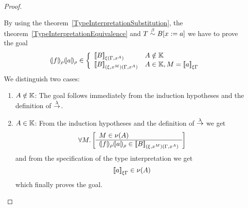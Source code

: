 \begin{theorem}
\begin{proof}
\begin{enumerate}
            By using the theorem~\ref{TypeInterpretationSubstitution}, the
            theorem~\ref{TypeInterpretationEquivalence} and $T
            \stackrel{\beta}{\sim} B[x:=a]$ we have to prove the goal
            $$
            \terminter{f}{\rho}
            \terminter{a}{\rho}
            \in
            \left\{
                \begin{array}{ll}
                    \typeinter{B}{\xi(\Gamma,x^A)}
                    &
                    A \notin \Kinds
                    \\
                    \typeinter{B}{(\xi,x^M)(\Gamma,x^A)}
                    &
                    A \in \Kinds, M = \typeinter{a}{\xi\Gamma}
                \end{array}
            \right.
            $$
            We distinguish two cases:
            \begin{enumerate}
            \item $A \notin \mathbb{K}$: The goal follows immediately from the
                induction hypotheses and the definition of $\stackrel{\lambda}{\to}$.

            \item $A \in \mathbb{K}$: From the induction hypotheses and the
                definition of $\stackrel{\lambda}{\to}$ we get
                $$
                    \forall M. \left[ \begin{array}{l} M \in \nu(A) \\ \hline 
                        {(\!|f|\!)_{\rho}}
                        {(\!|a|\!)_{\rho}}
                        \in
                        {{[\![}B{]\!]}}_{(\xi,x^M)(\Gamma,x^A)}
                    \end{array} \right]
                $$
                and from the specification of the type interpretation we get
                $$
                    {{[\![} a{]\!]}}_{\xi\Gamma} \in \nu(A)
                $$
                which finally proves the goal.
            \end{enumerate}
        \end{enumerate}
    \end{proof}
\end{theorem}
